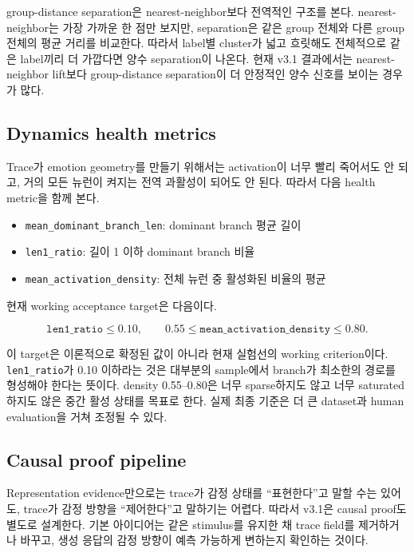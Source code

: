 \documentclass[11pt,a4paper]{article}
\begin{document}
group-distance separation은 nearest-neighbor보다 전역적인 구조를 본다. nearest-neighbor는 가장 가까운 한 점만 보지만, separation은 같은 group 전체와 다른 group 전체의 평균 거리를 비교한다. 따라서 label별 cluster가 넓고 흐릿해도 전체적으로 같은 label끼리 더 가깝다면 양수 separation이 나온다. 현재 v3.1 결과에서는 nearest-neighbor lift보다 group-distance separation이 더 안정적인 양수 신호를 보이는 경우가 많다.

\subsection{Dynamics health metrics}

Trace가 emotion geometry를 만들기 위해서는 activation이 너무 빨리 죽어서도 안 되고, 거의 모든 뉴런이 켜지는 전역 과활성이 되어도 안 된다. 따라서 다음 health metric을 함께 본다.

\begin{itemize}
  \item \texttt{mean\_dominant\_branch\_len}: dominant branch 평균 길이
  \item \texttt{len1\_ratio}: 길이 1 이하 dominant branch 비율
  \item \texttt{mean\_activation\_density}: 전체 뉴런 중 활성화된 비율의 평균
\end{itemize}

현재 working acceptance target은 다음이다.

\[
\texttt{len1\_ratio} \leq 0.10, \qquad
0.55 \leq \texttt{mean\_activation\_density} \leq 0.80.
\]

이 target은 이론적으로 확정된 값이 아니라 현재 실험선의 working criterion이다. \texttt{len1\_ratio}가 0.10 이하라는 것은 대부분의 sample에서 branch가 최소한의 경로를 형성해야 한다는 뜻이다. density 0.55--0.80은 너무 sparse하지도 않고 너무 saturated하지도 않은 중간 활성 상태를 목표로 한다. 실제 최종 기준은 더 큰 dataset과 human evaluation을 거쳐 조정될 수 있다.

\subsection{Causal proof pipeline}

Representation evidence만으로는 trace가 감정 상태를 ``표현한다''고 말할 수는 있어도, trace가 감정 방향을 ``제어한다''고 말하기는 어렵다. 따라서 v3.1은 causal proof도 별도로 설계한다. 기본 아이디어는 같은 stimulus를 유지한 채 trace field를 제거하거나 바꾸고, 생성 응답의 감정 방향이 예측 가능하게 변하는지 확인하는 것이다.
\end{document}
